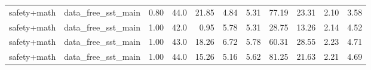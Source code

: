 \begin{table}[H]
{\begin{tabular}{llllrrrrrrr}
safety+math & data\_free\_sst\_main & 0.80 & 44.0 & 21.85 & 4.84 & 5.31 & 77.19 & 23.31 & 2.10 & 3.58 \\
safety+math & data\_free\_sst\_main & 1.00 & 42.0 & 0.95 & 5.78 & 5.31 & 28.75 & 13.26 & 2.14 & 4.52 \\
safety+math & data\_free\_sst\_main & 1.00 & 43.0 & 18.26 & 6.72 & 5.78 & 60.31 & 28.55 & 2.23 & 4.71 \\
safety+math & data\_free\_sst\_main & 1.00 & 44.0 & 15.26 & 5.16 & 5.62 & 81.25 & 21.63 & 2.21 & 4.69 \\
\bottomrule
\end{tabular}
}
\end{table}
